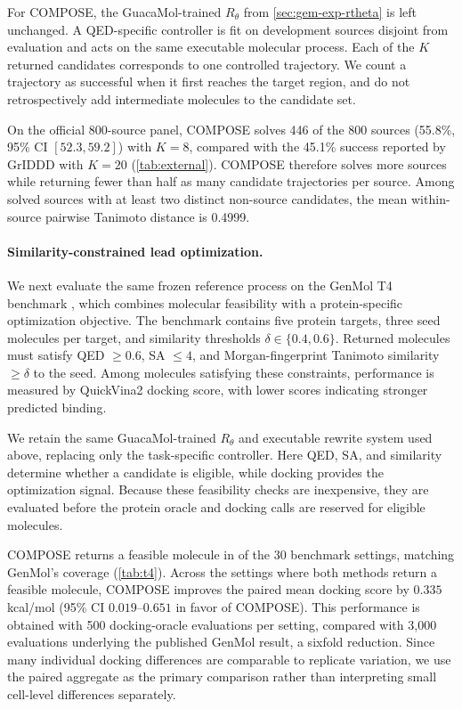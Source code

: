 For COMPOSE, the GuacaMol-trained $R_\theta$ from \cref{sec:gem-exp-rtheta} is
left unchanged. A QED-specific controller is fit on development sources disjoint
from evaluation and acts on the same executable molecular process. Each of the
$K$ returned candidates corresponds to one controlled trajectory. We count a
trajectory as successful when it first reaches the target region, and do not
retrospectively add intermediate molecules to the candidate set.

On the official 800-source panel, COMPOSE solves 446 of the 800 sources
(55.8\%, 95\% CI $[52.3,59.2]$) with $K=8$, compared with the 45.1\% success
reported by GrIDDD with $K=20$ (\cref{tab:external}). COMPOSE therefore solves
more sources while returning fewer than half as many candidate trajectories per
source. Among solved sources with at least two distinct non-source candidates,
the mean within-source pairwise Tanimoto distance is 0.4999.

\paragraph{Similarity-constrained lead optimization.}
We next evaluate the same frozen reference process on the GenMol T4 benchmark
\citep{lee2025genmol}, which combines molecular feasibility with a
protein-specific optimization objective. The benchmark contains five protein
targets, three seed molecules per target, and similarity thresholds
$\delta\in\{0.4,0.6\}$. Returned molecules must satisfy QED $\geq 0.6$, SA
$\leq 4$, and Morgan-fingerprint Tanimoto similarity $\geq\delta$ to the seed.
Among molecules satisfying these constraints, performance is measured by
QuickVina2 docking score, with lower scores indicating stronger predicted
binding.

We retain the same GuacaMol-trained $R_\theta$ and executable rewrite system used
above, replacing only the task-specific controller. Here QED, SA, and similarity
determine whether a candidate is eligible, while docking provides the
optimization signal. Because these feasibility checks are inexpensive, they are
evaluated before the protein oracle and docking calls are reserved for eligible
molecules.



COMPOSE returns a feasible molecule in \TFourCoverage{} of the 30 benchmark
settings, matching GenMol's coverage (\cref{tab:t4}). Across the \TFourPairedN{}
settings where both methods return a feasible molecule, COMPOSE improves the
paired mean docking score by $0.335$ kcal/mol (95\% CI $0.019$--$0.651$ in favor
of COMPOSE). This performance is obtained with 500 docking-oracle evaluations per
setting, compared with 3{,}000 evaluations underlying the published GenMol
result, a sixfold reduction. Since many individual docking differences are
comparable to replicate variation, we use the paired aggregate as the primary
comparison rather than interpreting small cell-level differences separately.

